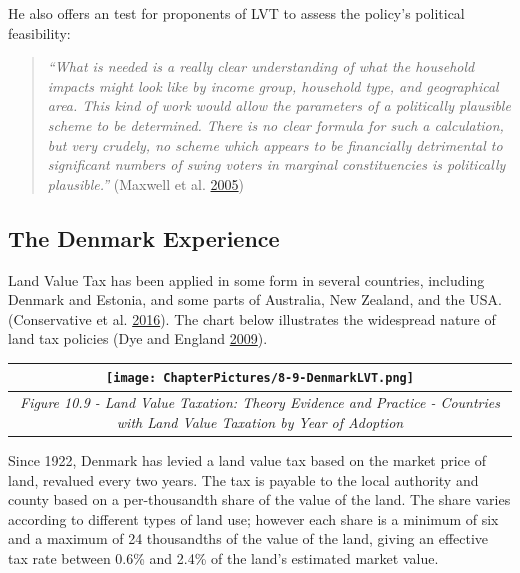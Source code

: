 \documentclass[]{tufte-handout}
\begin{document}
He also offers an test for proponents of LVT to assess the policy's
political feasibility:

\begin{quote}
\emph{``What is needed is a really clear understanding of what the
household impacts might look like by income group, household type, and
geographical area. This kind of work would allow the parameters of a
politically plausible scheme to be determined. There is no clear formula
for such a calculation, but very crudely, no scheme which appears to be
financially detrimental to significant numbers of swing voters in
marginal constituencies is politically plausible.''} (Maxwell et al.
\protect\hyperlink{ref-Maxwell}{2005})
\end{quote}

\hypertarget{the-denmark-experience}{%
\subsection{The Denmark Experience}\label{the-denmark-experience}}

Land Value Tax has been applied in some form in several countries,
including Denmark and Estonia, and some parts of Australia, New Zealand,
and the USA. (Conservative et al.
\protect\hyperlink{ref-Conservative2016}{2016}). The chart below
illustrates the widespread nature of land tax policies (Dye and England
\protect\hyperlink{ref-Dye2009}{2009}).

\begin{longtable}[]{@{}c@{}}
\toprule
\begin{minipage}[b]{0.97\columnwidth}\centering
\texttt{[image: ChapterPictures/8-9-DenmarkLVT.png]}\strut
\end{minipage}\tabularnewline
\midrule
\endhead
\begin{minipage}[t]{0.97\columnwidth}\centering
\emph{Figure 10.9 - Land Value Taxation: Theory Evidence and Practice -
Countries with Land Value Taxation by Year of Adoption}\strut
\end{minipage}\tabularnewline
\bottomrule
\end{longtable}

Since 1922, Denmark has levied a land value tax based on the market
price of land, revalued every two years. The tax is payable to the local
authority and county based on a per-thousandth share of the value of the
land. The share varies according to different types of land use; however
each share is a minimum of six and a maximum of 24 thousandths of the
value of the land, giving an effective tax rate between 0.6\% and 2.4\%
of the land's estimated market value.
\end{document}
